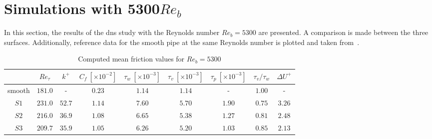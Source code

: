 \section{Simulations with 5300$Re_b$}\label{sec: results 5300Reb}
In this section, the results of the \acrshort{dns} study with the Reynolds number $Re_b = 5300$ are presented.
A comparison is made between the three surfaces.
Additionally, reference data for the smooth pipe at the same Reynolds number is plotted and taken from~\cite{yaoDirectNumericalSimulations2023}.
\begin{table}
    \centering
    \caption[Mean friction values for $Re_b = 5300$]{Computed mean friction values for $Re_b = 5300$}
    \begin{tabular}{c c c c c c c c c}
        \toprule
                & $Re_\tau$ & $k^+$     & $C_f\ [\times10^{-2}]$ & $\tau_w\ [\times10^{-3}]$ & $\tau_v\ [\times10^{-3}]$ & $\tau_p\ [\times10^{-3}]$ & $\tau_v/\tau_w$   & $\Delta U^+$\\
        \midrule
        smooth  & $181.0$   & -        & $0.23$   & $1.14$   & $1.14$   & -                     & $1.00$           & - \\
        $S1$    & $231.0$   & $52.7$   & $1.14$   & $7.60$   & $5.70$   & $1.90$    & $0.75$           & $3.26$\\
        $S2$    & $216.0$   & $36.9$   & $1.08$   & $6.65$   & $5.38$   & $1.27$    & $0.81$           & $2.48$\\
        $S3$    & $209.7$   & $35.9$   & $1.05$   & $6.26$   & $5.20$   & $1.03$    & $0.85$           & $2.13$\\
        \bottomrule
    \end{tabular}
    
    \label{tab: friction values Reb 5300}
\end{table}
